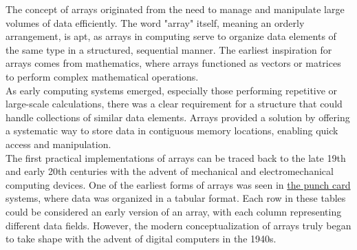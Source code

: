 \documentclass[12pt, oneside]{book}
\begin{document}
The concept of arrays originated from the need to manage and manipulate large volumes of data efficiently. The word "array" itself, meaning an orderly arrangement, is apt, as arrays in computing serve to organize data elements of the same type in a structured, sequential manner. The earliest inspiration for arrays comes from mathematics, where arrays functioned as vectors or matrices to perform complex mathematical operations.\\As early computing systems emerged, especially those performing repetitive or large-scale calculations, there was a clear requirement for a structure that could handle collections of similar data elements. Arrays provided a solution by offering a systematic way to store data in contiguous memory locations, enabling quick access and manipulation.\\The first practical implementations of arrays can be traced back to the late 19th and early 20th centuries with the advent of mechanical and electromechanical computing devices. One of the earliest forms of arrays was seen in \href{https://en.wikipedia.org/wiki/Punched_card}{the punch card} systems, where data was organized in a tabular format. Each row in these tables could be considered an early version of an array, with each column representing different data fields. However, the modern conceptualization of arrays truly began to take shape with the advent of digital computers in the 1940s.
	
\end{document}
